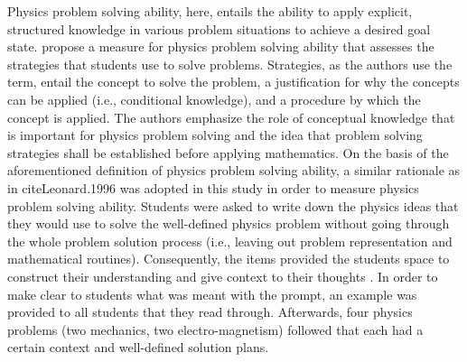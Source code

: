 \documentclass[]{interact}
\begin{document}
Physics problem solving ability, here, entails the ability to apply explicit, structured knowledge in various problem situations to achieve a desired goal state. \cite{Leonard.1996} propose a measure for physics problem solving ability that assesses the strategies that students use to solve problems. Strategies, as the authors use the term, entail the concept to solve the problem, a justification for why the concepts can be applied (i.e., conditional knowledge), and a procedure by which the concept is applied. The authors emphasize the role of conceptual knowledge that is important for physics problem solving and the idea that problem solving strategies shall be established before applying mathematics. On the basis of the aforementioned definition of physics problem solving ability, a similar rationale as in cite{Leonard.1996} was adopted in this study in order to measure physics problem solving ability. Students were asked to write down the physics ideas that they would use to solve the well-defined physics problem without going through the whole problem solution process (i.e., leaving out problem representation and mathematical routines). Consequently, the items provided the students space to construct their understanding and give context to their thoughts \citep{Hammann.2014}. In order to make clear to students what was meant with the prompt, an example was provided to all students that they read through. Afterwards, four physics problems (two mechanics, two electro-magnetism) followed that each had a certain context and well-defined solution plans.
\end{document}
